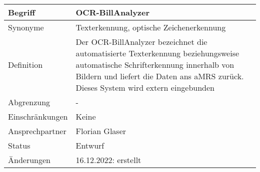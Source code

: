 \begin{table}[H]
    \centering
    \label{gls:ocr-BillAnalyzer}
    \begin{tabularx}{\textwidth}{| l | X |}
        \hline
        Begriff         & OCR-BillAnalyzer                                                                                                                                                                                                  \\
        \hline
        Synonyme        & Texterkennung, optische Zeichenerkennung                                                                                                                                                                          \\
        \hline
        Definition      & Der OCR-BillAnalyzer bezeichnet die automatisierte Texterkennung beziehungsweise automatische Schrifterkennung innerhalb von Bildern und liefert die Daten ans aMRS zurück. Dieses System wird extern eingebunden \\
        \hline
        Abgrenzung      & -                                                                                                                                                                                                                 \\
        \hline
        Einschränkungen & Keine                                                                                                                                                                                                             \\
        \hline
        Ansprechpartner & Florian Glaser                                                                                                                                                                                                    \\
        \hline
        Status          & Entwurf                                                                                                                                                                                                           \\
        \hline
        Änderungen      & 16.12.2022: erstellt                                                                                                                                                                                              \\
        \hline
    \end{tabularx}
\end{table}



